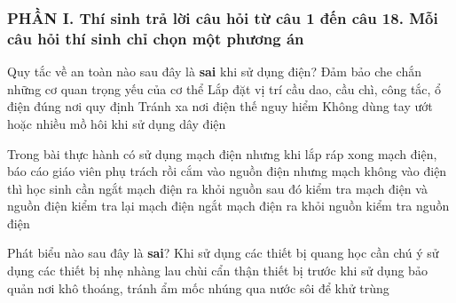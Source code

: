 \subsubsection*{PHẦN I. Thí sinh trả lời câu hỏi từ câu 1 đến câu 18. Mỗi câu hỏi thí sinh chỉ chọn một phương án}
\setcounter{ex}{0}%
\begin{ex}%
Quy tắc về an toàn nào sau đây là \textbf{sai} khi sử dụng điện?
\choice
{\True Đảm bảo che chắn những cơ quan trọng yếu của cơ thể}
{Lắp đặt vị trí cầu dao, cầu chì, công tắc, ổ điện đúng nơi quy định}
{Tránh xa nơi điện thế nguy hiểm}
{Không dùng tay ướt hoặc nhiều mồ hôi khi sử dụng dây điện}	
\end{ex}

\begin{ex}%
Trong bài thực hành có sử dụng mạch điện nhưng khi lắp ráp xong mạch điện, báo cáo giáo viên phụ trách rồi cắm vào nguồn điện nhưng mạch không vào điện thì học sinh cần
\choice
{\True ngắt mạch điện ra khỏi nguồn sau đó kiểm tra mạch điện và nguồn điện}
{kiểm tra lại mạch điện}
{ngắt mạch điện ra khỏi nguồn}
{kiểm tra nguồn điện}	
\end{ex}

\begin{ex}%
Phát biểu nào sau đây là \textbf{sai}? Khi sử dụng các thiết bị quang học cần chú ý
\choice
{sử dụng các thiết bị nhẹ nhàng}
{lau chùi cẩn thận thiết bị trước khi sử dụng}
{bảo quản nơi khô thoáng, tránh ẩm mốc}
{\True nhúng qua nước sôi để khử trùng}
\end{ex}




\begin{ex}%
\end{ex}

